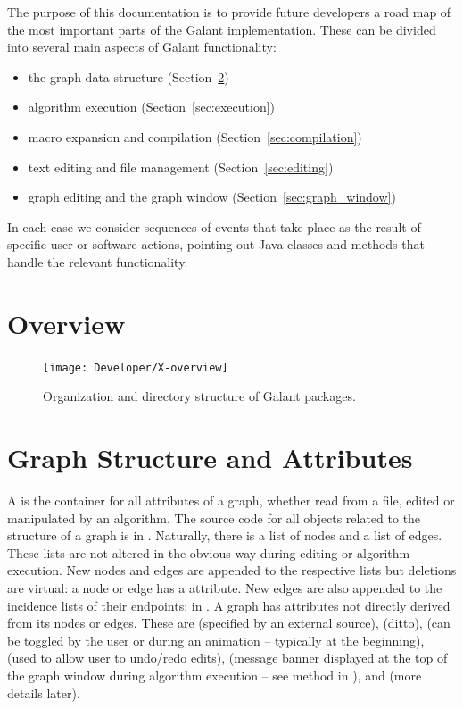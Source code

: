 The purpose of this documentation is to provide future developers a
road map of the most important parts of the Galant implementation. These can
be divided into several main aspects of Galant functionality:
\begin{itemize}
\item the graph data structure (Section~\ref{sec:graph_structure})
\item algorithm execution (Section~\ref{sec:execution})
\item macro expansion and compilation (Section~\ref{sec:compilation})
\item text editing and file management (Section~\ref{sec:editing})
\item graph editing and the graph window (Section~\ref{sec:graph_window})
\end{itemize}
In each case we consider sequences of events that take place as the result of
specific user or software actions, pointing out Java classes and methods that
handle the relevant functionality.

\section{Overview}

\begin{figure}
  \texttt{[image: Developer/X-overview]}

  \medskip
  \caption{Organization and directory structure of Galant packages.}
  \label{fig:overview}
\end{figure}



\section{Graph Structure and Attributes} \label{sec:graph_structure}

A  is the container for all attributes of a graph, whether read
from a file, edited or manipulated by an algorithm.
The source code for all objects related to the structure of a graph is in
.
Naturally, there is a list of nodes and a list of edges.
These lists are not altered in the obvious way during editing or algorithm
execution. New nodes and edges are appended to the respective lists but
deletions are virtual: a node or edge has a  attribute.
New edges are also appended to the incidence lists of their endpoints:
 in .
A graph has attributes not directly derived from its nodes or edges. These
are  (specified by an external source),  (ditto),
 (can be toggled by the user or during an animation --
typically at the beginning),
 (used to allow user to undo/redo edits),
 (message banner
displayed at the top of the graph window during algorithm execution -- see
method  in ),
and  (more details later).

